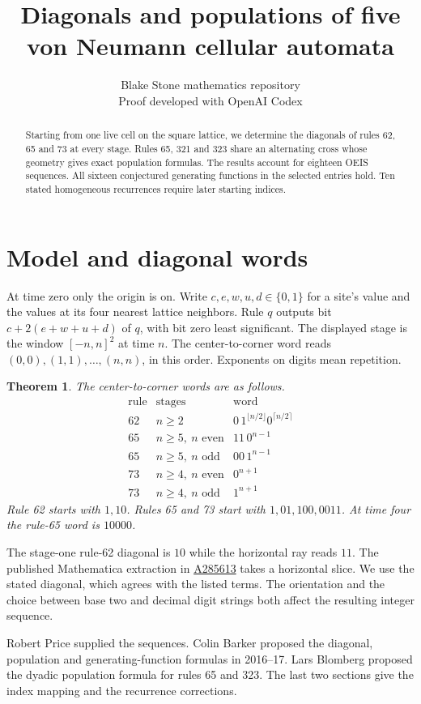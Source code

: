 \documentclass[11pt]{article}
\title{Diagonals and populations of five von Neumann cellular automata}
\author{Blake Stone mathematics repository\\[-2pt]\small Proof developed with OpenAI Codex}
\date{}
\newtheorem{theorem}{Theorem}
\newcommand{\oeis}[1]{\href{https://oeis.org/A#1}{A#1}}
\begin{document}
\maketitle
\begin{abstract}
Starting from one live cell on the square lattice, we determine the diagonals
of rules 62, 65 and 73 at every stage. Rules 65, 321 and 323 share an
alternating cross whose geometry gives exact population formulas.
The results account for eighteen OEIS sequences. All sixteen conjectured
generating functions in the selected entries hold. Ten stated homogeneous
recurrences require later starting indices.
\end{abstract}
\section{Model and diagonal words}
At time zero only the origin is on. Write $c,e,w,u,d\in\{0,1\}$ for a site's
value and the values at its four nearest lattice neighbors. Rule $q$
outputs bit $c+2(e+w+u+d)$ of $q$, with bit zero least significant.
The displayed stage is the window $[-n,n]^2$ at time $n$.
The center-to-corner word reads $(0,0),(1,1),\ldots,(n,n)$, in this order.
Exponents on digits mean repetition.
\begin{theorem}\label{words}
The center-to-corner words are as follows.
\[
\begin{array}{ccl}
\text{rule}&\text{stages}&\text{word}\\\hline
62& n\ge2&0\,1^{\lfloor n/2\rfloor}0^{\lceil n/2\rceil}\\
65& n\ge5,\ n\text{ even}&11\,0^{n-1}\\
65& n\ge5,\ n\text{ odd}&00\,1^{n-1}\\
73& n\ge4,\ n\text{ even}&0^{n+1}\\
73& n\ge4,\ n\text{ odd}&1^{n+1}
\end{array}
\]
Rule 62 starts with $1,10$. Rules 65 and 73 start with $1,01,100,0011$.
At time four the rule-65 word is $10000$.
\end{theorem}
The stage-one rule-62 diagonal is $10$ while the horizontal ray reads $11$.
The published Mathematica extraction in \oeis{285613} takes a horizontal slice.
We use the stated diagonal, which agrees with the listed terms.
The orientation and the choice between base two and decimal digit strings
both affect the resulting integer sequence.

Robert Price supplied the sequences. Colin Barker proposed the diagonal,
population and generating-function formulas in 2016--17. Lars Blomberg proposed
the dyadic population formula for rules 65 and 323. The last two sections
give the index mapping and the recurrence corrections.
\end{document}
